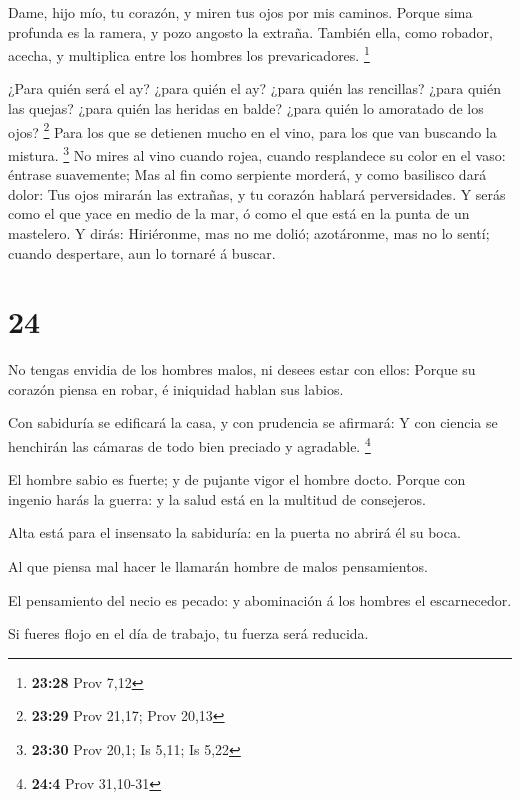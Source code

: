  Dame, hijo mío, tu corazón, y miren tus ojos por mis
caminos.  Porque sima profunda es la ramera, y pozo
angosto la extraña.  También ella, como robador, acecha,
y multiplica entre los hombres los prevaricadores. \footnote{\textbf{23:28}
  Prov 7,12}

 ¿Para quién será el ay? ¿para quién el ay? ¿para quién
las rencillas? ¿para quién las quejas? ¿para quién las heridas en balde?
¿para quién lo amoratado de los ojos? \footnote{\textbf{23:29} Prov
  21,17; Prov 20,13}  Para los que se detienen mucho en
el vino, para los que van buscando la mistura. \footnote{\textbf{23:30}
  Prov 20,1; Is 5,11; Is 5,22}  No mires al vino cuando
rojea, cuando resplandece su color en el vaso: éntrase suavemente;
 Mas al fin como serpiente morderá, y como basilisco dará
dolor:  Tus ojos mirarán las extrañas, y tu corazón
hablará perversidades.  Y serás como el que yace en medio
de la mar, ó como el que está en la punta de un mastelero.
 Y dirás: Hiriéronme, mas no me dolió; azotáronme, mas no
lo sentí; cuando despertare, aun lo tornaré á buscar.

\hypertarget{section-23}{%
\section{24}\label{section-23}}

 No tengas envidia de los hombres malos, ni desees estar
con ellos:  Porque su corazón piensa en robar, é iniquidad
hablan sus labios.

 Con sabiduría se edificará la casa, y con prudencia se
afirmará:  Y con ciencia se henchirán las cámaras de todo
bien preciado y agradable. \footnote{\textbf{24:4} Prov 31,10-31}

 El hombre sabio es fuerte; y de pujante vigor el hombre
docto.  Porque con ingenio harás la guerra: y la salud
está en la multitud de consejeros.

 Alta está para el insensato la sabiduría: en la puerta no
abrirá él su boca.

 Al que piensa mal hacer le llamarán hombre de malos
pensamientos.

 El pensamiento del necio es pecado: y abominación á los
hombres el escarnecedor.

 Si fueres flojo en el día de trabajo, tu fuerza será
reducida.

